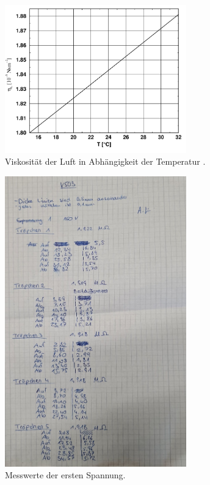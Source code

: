 \begin{figure}
    \centering
    \includegraphics[width=0.7\textwidth]{bilder/viskositaet.png}
    \caption{Viskosität der Luft in Abhängigkeit der Temperatur \cite{sample}.}
    \label{fig:viskositaet}
\end{figure}

\begin{figure}
    \centering
    \includegraphics[width=0.7\textwidth]{bilder/Spannung1.jpg}
    \caption{Messwerte der ersten Spannung.}
\end{figure}


